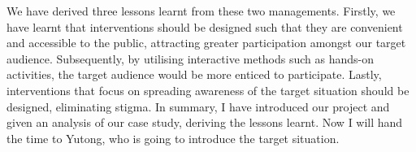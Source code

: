 \documentclass{article}
\begin{document}
 We have derived three lessons learnt from these two managements. Firstly, we have learnt that interventions should be designed such that they are convenient and accessible  to the public, attracting greater participation amongst our target audience. Subsequently, by utilising interactive  methods such as hands-on activities, the target audience would be more enticed to participate. Lastly, interventions that focus on spreading awareness  of the target situation should be designed, eliminating stigma. In summary, I have introduced our project and given an analysis of our case study, deriving the lessons learnt. Now I will hand the time to Yutong, who is going to introduce the target situation.\par
\end{document}

